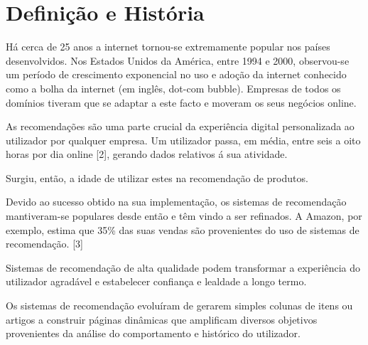 \section{Definição e História}

Há cerca de 25 anos a internet tornou-se extremamente popular nos países desenvolvidos. Nos Estados Unidos da América, entre 1994 e 2000, observou-se um período de crescimento exponencial no uso e adoção da internet conhecido como a bolha da internet (em inglês, dot-com bubble). Empresas de todos os domínios tiveram que se adaptar a este facto e moveram os seus negócios online. 

As recomendações são uma parte crucial da experiência digital personalizada ao utilizador por qualquer empresa. Um utilizador passa, em média, entre seis a oito horas por dia online [2], gerando dados relativos á sua atividade. 

Surgiu, então, a idade de utilizar estes na recomendação de produtos. 

Devido ao sucesso obtido na sua implementação, os sistemas de recomendação mantiveram-se populares desde então e têm vindo a ser refinados. A Amazon, por exemplo, estima que 35\% das suas vendas são provenientes do uso de sistemas de recomendação. [3] 

Sistemas de recomendação de alta qualidade podem transformar a experiência do utilizador agradável e estabelecer confiança e lealdade a longo termo. 

Os sistemas de recomendação evoluíram de gerarem simples colunas de itens ou artigos a construir páginas dinâmicas que amplificam diversos objetivos provenientes da análise do comportamento e histórico do utilizador. 
